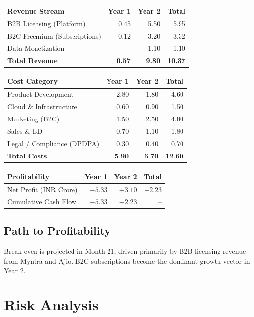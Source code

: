 \documentclass[12pt,a4paper]{article}
\begin{document}
\begin{table}[ht]
\centering
\begin{tabular}{lrrr}
\toprule
\textbf{Revenue Stream} & \textbf{Year 1} & \textbf{Year 2} & \textbf{Total} \\
\midrule
B2B Licensing (Platform) & 0.45 & 5.50 & 5.95 \\
B2C Freemium (Subscriptions) & 0.12 & 3.20 & 3.32 \\
Data Monetization & -- & 1.10 & 1.10 \\
\midrule
\textbf{Total Revenue} & \textbf{0.57} & \textbf{9.80} & \textbf{10.37} \\
\bottomrule
\end{tabular}
\bigskip
\begin{tabular}{lrrr}
\toprule
\textbf{Cost Category} & \textbf{Year 1} & \textbf{Year 2} & \textbf{Total} \\
\midrule
Product Development & 2.80 & 1.80 & 4.60 \\
Cloud \& Infrastructure & 0.60 & 0.90 & 1.50 \\
Marketing (B2C) & 1.50 & 2.50 & 4.00 \\
Sales \& BD & 0.70 & 1.10 & 1.80 \\
Legal / Compliance (DPDPA) & 0.30 & 0.40 & 0.70 \\
\midrule
\textbf{Total Costs} & \textbf{5.90} & \textbf{6.70} & \textbf{12.60} \\
\bottomrule
\end{tabular}
\bigskip
\begin{tabular}{lrrr}
\toprule
\textbf{Profitability} & \textbf{Year 1} & \textbf{Year 2} & \textbf{Total} \\
\midrule
Net Profit (INR Crore) & $-5.33$ & $+3.10$ & $-2.23$ \\
Cumulative Cash Flow & $-5.33$ & $-2.23$ & -- \\
\midrule
\end{tabular}
\end{table}

\subsection{Path to Profitability}
Break-even is projected in Month 21, driven primarily by B2B licensing revenue from Myntra and Ajio. B2C subscriptions become the dominant growth vector in Year 2.

\section{Risk Analysis}
\end{document}
